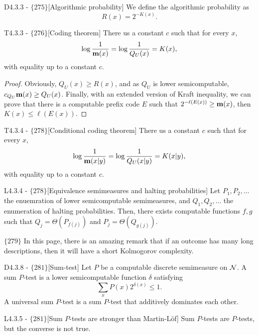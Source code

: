 \documentclass{article}
\begin{document}
\begin{flexidefinition}{D4.3.3 - $\{275\}$}[Algorithmic probability]
    We define the algorithmic probability as
    \begin{equation}
        R(x) = 2^{-K(x)}.
    \end{equation}
\end{flexidefinition}

\begin{flexitheorem}{T4.3.3 - $\{276\}$}[Coding theorem]
    There us a constant $c$ such that for every $x$,
    \begin{equation}
        \log \frac{1}{{\bf m}(x)} = \log \frac{1}{Q_U(x)} = K(x),
    \end{equation}
    with equality up to a constant $c$.
\end{flexitheorem}
\begin{proof}
    Obviously, $Q_U(x) \geq R(x)$, and as $Q_U$ is lower semicomputable, $c_{Q_U}{\bf m}(x) \geq Q_U(x)$. Finally, with an extended version of Kraft inequality, we can prove that there is a computable prefix code $E$ such that $2^{-\ell(E(x))} \geq {\bf m}(x)$, then $K(x) \leq \ell(E(x))$.
\end{proof}

\begin{flexitheorem}{T4.3.4 - $\{278\}$}[Conditional coding theorem]
    There us a constant $c$ such that for every $x$,
    \begin{equation}
        \log \frac{1}{{\bf m}(x|y)} = \log \frac{1}{Q_U(x|y)} = K(x|y),
    \end{equation}
    with equality up to a constant $c$.
\end{flexitheorem}

\begin{flexilemma}{L4.3.4 - $\{278\}$}[Equivalence semimeasures and halting probabilities]
    Let $P_1,P_2,\ldots$ the enuemration of lower semicomputable semimeasures, and $Q_1,Q_2,\ldots$ the enumeration of halting probabilities. Then, there exists computable functions $f,g$ such that $Q_j = \Theta(P_{f(j)})$ and $P_j = \Theta(Q_{g(j)})$.
\end{flexilemma}

$\{279\}$ In this page, there is an amazing remark that if an outcome has many long descriptions, then it will have a short Kolmogorov complexity.

\begin{flexidefinition}{D4.3.8 - $\{281\}$}[Sum-test]
    Let $P$ be a computable discrete semimeasure on $\mathcal{N}$. A sum $P$-test is a lower semicomputable function $\delta$ satisfying 
    \begin{equation}
        \sum_x P(x) 2^{\delta(x)} \leq 1.
    \end{equation}
    A universal sum $P$-test is a sum $P$-test that additively dominates each other.
\end{flexidefinition}
\begin{flexilemma}{L4.3.5 - $\{281\}$}[Sum $P$-tests are stronger than Martin-Löf]
    Sum $P$-tests are $P$-tests, but the converse is not true.
\end{flexilemma}
\end{document}
